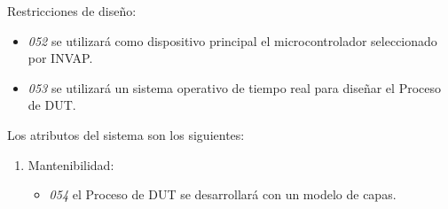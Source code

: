 Restricciones de diseño:

\begin{itemize}
	\item \emph{052} se utilizará como dispositivo principal el microcontrolador seleccionado por INVAP.
	\item \emph{053} se utilizará un sistema operativo de tiempo real para diseñar el Proceso de DUT.
\end{itemize}

Los atributos del sistema son los siguientes:

\begin{enumerate}
	\item Mantenibilidad:
	\begin{itemize}
		\item \emph{054} el Proceso de DUT se desarrollará con un modelo de capas.
	\end{itemize}
\end{enumerate}
